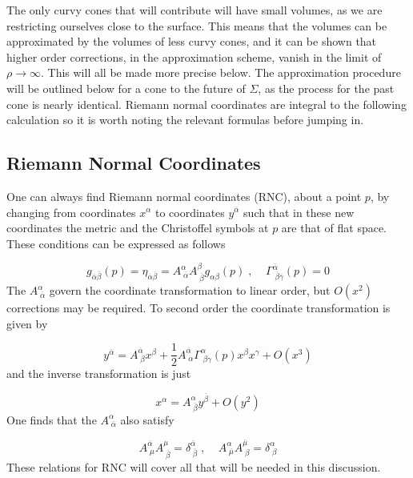 \documentclass[12pt]{article}
\newcommand{\be}{\begin{equation}}
\newcommand{\ee}{\end{equation}}
\begin{document}
The only curvy cones that will contribute will have small volumes, as we are restricting ourselves close to the surface. This means that the volumes can be approximated by the volumes of less curvy cones, and it can be shown that higher order corrections, in the approximation scheme, vanish in the limit of $\rho \rightarrow \infty$. This will all be made more precise below. The approximation procedure will be outlined below for a cone to the future of $\Sigma$, as the process for the past cone is nearly identical. Riemann normal coordinates are integral to the following calculation so it is worth noting the relevant formulas before jumping in. 

\subsection{Riemann Normal Coordinates}

One can always find Riemann normal coordinates (RNC), about a point $p$, by changing from coordinates $x^{\alpha}$ to coordinates $y^{\overline{\alpha}}$ such that in these new coordinates the metric and the Christoffel symbols at $p$ are that of flat space. These conditions  can be expressed as follows

\be\label{eq:RNCMetricTransAtPAndChris}
g_{\overline{\alpha} \overline{\beta}}(p)=\eta_{\overline{\alpha} \overline{\beta}}=A^{\alpha}_{\;\overline{\alpha}}A^{\beta}_{\;\overline{\beta}}g_{\alpha\beta}(p)\;,\;\;\;\;\Gamma^{\overline{\alpha}}_{\;\overline{\beta}\overline{\gamma}}(p)=0
\ee
The $A^{\alpha}_{\;\overline{\alpha}}$ govern the coordinate transformation to linear order, but $O(x^2)$ corrections may be required. To second order the coordinate transformation is given by

\be\label{eq:RNCtotaltrans}
y^{\overline{\alpha}}=A^{\overline{\alpha}}_{\;\beta}x^\beta+\frac{1}{2}A^{\overline{\alpha}}_{\;\alpha}\Gamma^{\alpha}_{\;\beta\gamma}(p)x^\beta x^\gamma+O(x^3)
\ee
and the inverse transformation is just

\be\label{eq:RNCinversetrans}
x^{\alpha}=A^{\alpha}_{\;\overline{\beta}}y^{\overline{\beta}}+O(y^2)
\ee
One finds that the $A^{\alpha}_{\;\overline{\alpha}}$ also satisfy

\be\label{eq:RNCeqnforA}
A^{\overline{\alpha}}_{\;\mu}A^{\mu}_{\;\overline{\beta}}=\delta^{\overline{\alpha}}_{\;\overline{\beta}}\;,\;\;\;\;A^{\alpha}_{\;\overline{\mu}}A^{\overline{\mu}}_{\;\beta}=\delta^{\alpha}_{\;\beta}
\ee
These relations for RNC will cover all that will be needed in this discussion.
\end{document}
